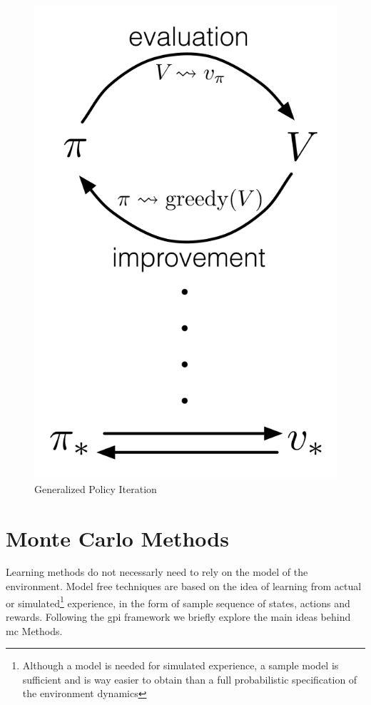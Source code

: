 \begin{figure}
    \centering
    \includegraphics[scale=.2]{images/gpi.png}
    \caption{Generalized Policy Iteration}
    \label{fig:gpi}
\end{figure}

\section{Monte Carlo Methods}
Learning methods do not necessarly need to rely on the model of the environment. Model free techniques 
are based on the idea of learning from actual or simulated\footnote{Although a model is 
needed for simulated experience, a sample model is sufficient and is way easier to obtain than a 
full probabilistic specification of the environment dynamics} experience, in the form of sample sequence of states, 
actions and rewards.
Following the \gls{gpi} framework we briefly explore the main ideas behind \gls{mc} Methods.

